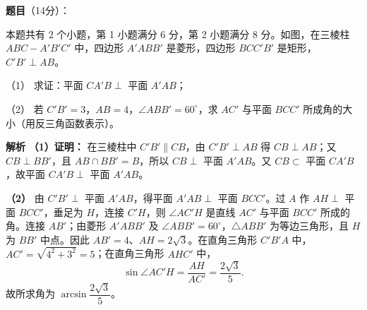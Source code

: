 \begin{answer}

\textbf{题目}（14分）：

本题共有 2 个小题，第 1 小题满分 6 分，第 2 小题满分 8 分。如图，在三棱柱 $ABC-A'B'C'$ 中，四边形 $A'ABB'$ 是菱形，四边形 $BCC'B'$ 是矩形，$C'B'\perp AB$。

（1） 求证：平面 $CA'B\perp$ 平面 $A'AB$；

（2） 若 $C'B'=3$，$AB=4$，$\angle ABB'=60^\circ$，求 $AC'$ 与平面 $BCC'$ 所成角的大小（用反三角函数表示）。
\nopagebreak[4]
\begin{center}\end{center}
\nopagebreak[4]
\textbf{解析}
\textbf{（1）证明：} 在三棱柱中 $C'B'\parallel CB$，由 $C'B'\perp AB$ 得 $CB\perp AB$；又 $CB\perp BB'$，且 $AB\cap BB'=B$，所以 $CB\perp$ 平面 $A'AB$。又 $CB\subset$ 平面 $CA'B$，故平面 $CA'B\perp$ 平面 $A'AB$。

\textbf{（2）} 由 $C'B'\perp$ 平面 $A'AB$，得平面 $A'AB\perp$ 平面 $BCC'$。过 $A$ 作 $AH\perp$ 平面 $BCC'$，垂足为 $H$，连接 $C'H$，则 $\angle AC'H$ 是直线 $AC'$ 与平面 $BCC'$ 所成的角。连接 $AB'$；由菱形 $A'ABB'$ 及 $\angle ABB'=60^\circ$，$\triangle ABB'$ 为等边三角形，且 $H$ 为 $BB'$ 中点。因此 $AB'=4$、$AH=2\sqrt3$。在直角三角形 $C'B'A$ 中，$AC'=\sqrt{4^2+3^2}=5$；在直角三角形 $AHC'$ 中，
\nopagebreak[4]
\[\sin\angle AC'H=\frac{AH}{AC'}=\frac{2\sqrt3}{5}.\]
故所求角为 $\arcsin\dfrac{2\sqrt3}{5}$。



\end{answer}
